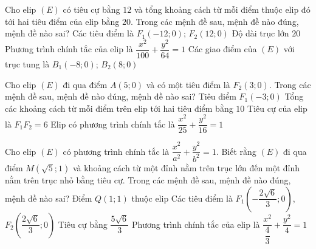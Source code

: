 
\begin{ex}%
	Cho elip $(E)$ có tiêu cự bằng $12$ và tổng khoảng cách từ mỗi điểm thuộc elip đó tới hai tiêu điểm của elip bằng $20$. Trong các mệnh đề sau, mệnh đề nào đúng, mệnh đề nào  sai?
	\choiceTF 
		{Các tiêu điểm là $F_1(-12;0)$;  $F_2(12;0)$}
		{\True  Độ dài trục lớn $20$ }
		{\True Phương trình chính tắc của  elip là $\dfrac{x^2}{100}+\dfrac{y^2}{64}=1$}
		{Các giao điểm của $(E)$ với  trục tung là $B_1(-8;0)$; $B_2(8;0)$}
\end{ex}

\begin{ex}%
	Cho elip $(E)$ đi qua điểm $A(5;0)$ và có một tiêu điểm là $F_2(3;0)$. Trong các mệnh  đề sau, mệnh đề nào đúng, mệnh đề nào sai?
	 \choiceTF
		{\True Tiêu  điểm $F_1(-3;0)$}
		{\True Tổng các khoảng cách từ mỗi điểm trên elip tới  hai tiêu điểm bằng $10$}
		{\True Tiêu cự của  elip là $F_1F_2=6$}
		{\True Elip có phương  trình chính tắc là $\dfrac{x^2}{25}+\dfrac{y^2}{16}=1$}
\end{ex}

\begin{ex}%
	Cho elip $(E)$ có phương trình chính tắc là $\dfrac{x^2}{a^2} + \dfrac{y^2}{b^2} = 1$. Biết rằng $(E)$ đi qua điểm $M(\sqrt{5};1)$ và khoảng cách từ một đỉnh nằm trên trục  lớn đến một đỉnh nằm trên trục nhỏ bằng tiêu cự. Trong các mệnh đề sau, mệnh đề nào đúng, mệnh đề nào sai?
	 \choiceTF
		{Điểm $Q(1;1)$  thuộc elip}
		{\True Các tiêu điểm là  $F_1\left(-\dfrac{2\sqrt{6}}{3};0\right)$, $F_2\left(\dfrac{2\sqrt{6}}{3};0\right)$}
		{Tiêu cự  bằng $\dfrac{5\sqrt{6}}{3}$}
		{Phương trình chính tắc của elip là $\dfrac{x^2}{\dfrac{4}{3}}+\dfrac{y^2}{4}=1$} 
\end{ex}


